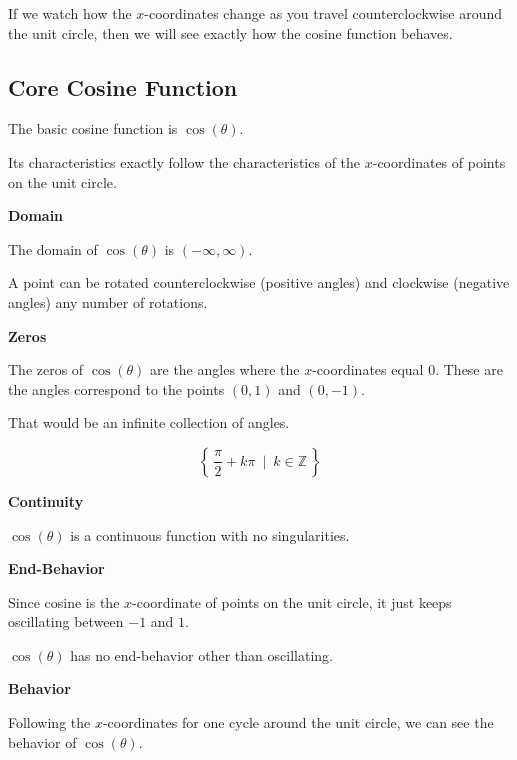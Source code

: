 \documentclass{ximera}
\begin{document}
If we watch how the $x$-coordinates change as you travel counterclockwise around the unit circle, then we will see exactly how the cosine function behaves.






\subsection*{Core Cosine Function}



The basic cosine function is $\cos(\theta)$.

Its characteristics exactly follow the characteristics of the $x$-coordinates of points on the unit circle.






\textbf{\textcolor{blue!55!black}{Domain}}

The domain of $\cos(\theta)$ is $(-\infty, \infty)$.

A point can be rotated counterclockwise (positive angles) and clockwise (negative angles) any number of rotations.



\textbf{\textcolor{blue!55!black}{Zeros}}


The zeros of $\cos(\theta)$ are the angles where the $x$-coordinates equal $0$.  These are the angles correspond to the points $(0,1)$ and $(0,-1)$.

That would be an infinite collection of angles.

\[
\left\{ \, \frac{\pi}{2} + k \pi\, \text{ | } \,  k \in \mathbb{Z} \,  \right\}
\]



\textbf{\textcolor{blue!55!black}{Continuity}}


$\cos(\theta)$ is a continuous function with no singularities.




\textbf{\textcolor{blue!55!black}{End-Behavior}}



Since cosine is the $x$-coordinate of points on the unit circle, it just keeps oscillating between $-1$ and $1$.

$\cos(\theta)$ has no end-behavior other than oscillating.




\textbf{\textcolor{blue!55!black}{Behavior}}


Following the $x$-coordinates for one cycle around the unit circle, we can see the behavior of $\cos(\theta)$.
\end{document}
